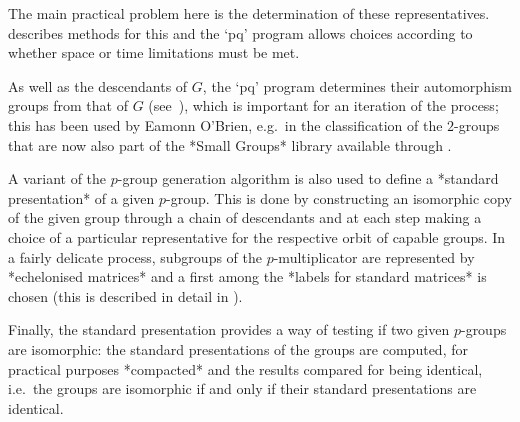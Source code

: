 The  main  practical  problem  here  is  the  determination  of  these
representatives. \cite{OBr90} describes methods for this and the  `pq'
program allows choices according to whether space or time  limitations
must be met.

As well as the descendants of $G$, the `pq'  program  determines their
automorphism  groups  from  that of $G$  (see~\cite{OBr95}),  which is
important  for  an iteration of the process;  this has  been  used  by
Eamonn O'Brien, e.g.~in the classification of the $2$-groups that  are
now also part of the *Small Groups* library available through {\GAP}.

A variant of the $p$-group generation algorithm is also used to define
a *standard presentation* of  a  given  $p$-group.  This  is  done  by
constructing an isomorphic copy of the given group through a chain  of
descendants  and  at  each  step  making  a  choice  of  a  particular
representative for the respective orbit of capable groups. In a fairly
delicate process, subgroups of the $p$-multiplicator  are  represented
by *echelonised matrices* and a first among the *labels  for  standard
matrices* is chosen (this is described in detail in \cite{OBr94}).

Finally, the standard presentation provides a way of  testing  if  two
given $p$-groups are isomorphic: the  standard  presentations  of  the
groups are  computed,  for  practical  purposes  *compacted*  and  the
results compared for being identical, i.e.~the groups  are  isomorphic
if and only if their standard presentations are identical.

